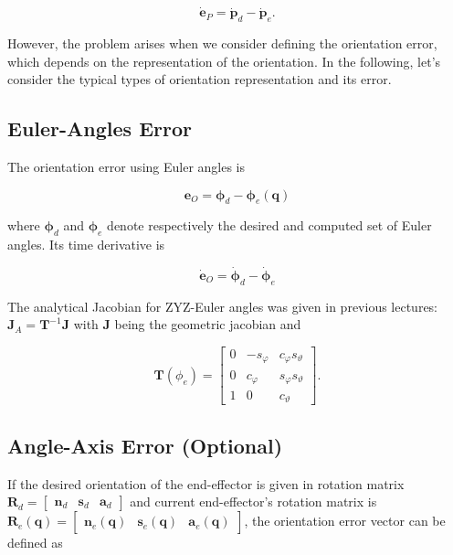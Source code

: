 \documentclass[10pt]{article}
\begin{document}
$$
\dot{\boldsymbol{e}}_{P}=\dot{\boldsymbol{p}}_{d}-\dot{\boldsymbol{p}}_{e} .
$$



However, the problem arises when we consider defining the orientation error, which depends on the representation of the orientation. In the following, let's consider the typical types of orientation representation and its error.







\subsection{Euler-Angles Error}
The orientation error using Euler angles is 

$$
\boldsymbol{e}_{O}=\boldsymbol{\phi}_{d}-\boldsymbol{\phi}_{e}(\boldsymbol{q})
$$

where $\boldsymbol{\phi}_{d}$ and $\boldsymbol{\phi}_{e}$ denote respectively the desired and computed set of Euler angles. Its time derivative is

$$
\dot{\boldsymbol{e}}_{O}=\dot{\boldsymbol{\phi}}_{d}-\dot{\boldsymbol{\phi}}_{e}
$$

The analytical Jacobian for ZYZ-Euler angles was given in previous lectures: $\boldsymbol{J}_{A}=\boldsymbol{T}^{-1}\boldsymbol{J}$ with $\boldsymbol{J}$ being the geometric jacobian and 

$$
\boldsymbol{T}\left(\phi_{e}\right) =\left[\begin{array}{ccc}
0 & -s_{\varphi} & c_{\varphi} s_{\vartheta} \\
0 & c_{\varphi} & s_{\varphi} s_{\vartheta} \\
1 & 0 & c_{\vartheta}
\end{array}\right] .
$$




\subsection{Angle-Axis Error (Optional)}

If the desired orientation  of the end-effector is given in rotation matrix $\boldsymbol{R}_{d}=\left[\begin{array}{lll}\boldsymbol{n}_{d} & \boldsymbol{s}_{d} & \boldsymbol{a}_{d}\end{array}\right]$ and current end-effector's rotation matrix is $\boldsymbol{R}_{e}(\boldsymbol{q})=\left[\begin{array}{lll}\boldsymbol{n}_{e}(\boldsymbol{q}) & \boldsymbol{s}_{e}(\boldsymbol{q}) & \boldsymbol{a}_{e}(\boldsymbol{q})\end{array}\right]$, the orientation error vector can be defined as 
\end{document}
